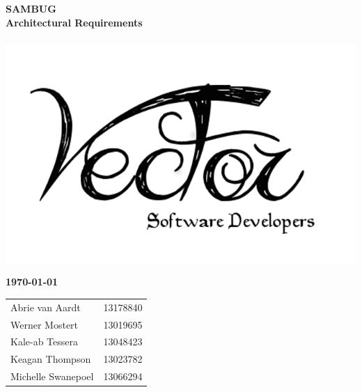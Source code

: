 \documentclass[11pt,a4paper,titlepage]{article}
\begin{document}

\begin{titlepage}
	
	
	\begin{center}
		\vspace*{-3cm}
	\end{center}
	
	
    \vspace*{2cm}
      \Huge \textbf {SAMBUG}\\
      
    \vspace*{-0.5cm}
	  \huge \textbf {Architectural Requirements}\\
	  \hfill\\
	\vspace*{-0.5cm}  
      \includegraphics[scale=0.2]{logo}
         
    \vskip2cm
          
    \large \textbf{\monthyeardate\today}
  
    \vfill
\begin{tabular}{lr}
        	Abrie van Aardt&13178840\\
		Werner Mostert&13019695\\
		Kale-ab Tessera&13048423\\
		Keagan Thompson&13023782\\
		Michelle Swanepoel&13066294\\
	\end{tabular}
\end{titlepage}
\end{document}
